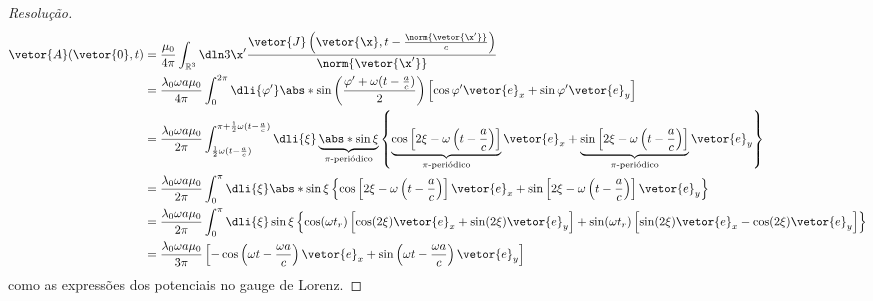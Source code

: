 \begin{proof}[Resolução]
\begin{align*}
      \vetor{A}(\vetor{0}, t) &= \frac{\mu_0}{4\pi}\int_{\mathbb{R}^3} \dln3{\x'} \frac{\vetor{J}\left(\vetor{\x}, t - \frac{\norm{\vetor{\x'}}}{c}\right)}{\norm{\vetor{\x'}}}\\
                              &= \frac{\lambda_0 \omega a \mu_0}{4\pi} \int_0^{2\pi} \dli{\varphi'}\abs*{\sin\left(\frac{\varphi' + \omega(t - \frac{a}{c})}{2}\right)} \left[\cos\varphi'\vetor{e}_x + \sin\varphi' \vetor{e}_y\right]\\
                              &= \frac{\lambda_0 \omega a \mu_0}{2\pi} \int_{\frac12 \omega(t - \frac{a}{c})}^{\pi + \frac12 \omega(t - \frac{a}{c})} \dli{\xi}\underbrace{\abs*{\sin\xi}}_{\pi\text{-periódico}} \left\{\underbrace{\cos\left[2 \xi - \omega\left(t - \frac{a}{c}\right)\right]}_{\pi\text{-periódico}}\vetor{e}_x + \underbrace{\sin\left[2 \xi - \omega\left(t - \frac{a}{c}\right)\right]}_{\pi\text{-periódico}}\vetor{e}_y\right\}\\
                              &= \frac{\lambda_0 \omega a \mu_0}{2\pi} \int_{0}^{\pi} \dli{\xi}\abs*{\sin\xi} \left\{\cos\left[2 \xi - \omega\left(t - \frac{a}{c}\right)\right]\vetor{e}_x + \sin\left[2 \xi - \omega\left(t - \frac{a}{c}\right)\right]\vetor{e}_y\right\}\\
                              &= \frac{\lambda_0 \omega a \mu_0}{2\pi}  \int_{0}^{\pi} \dli{\xi} \sin\xi \left\{\cos(\omega t_r)\left[\cos(2 \xi) \vetor{e}_x + \sin(2\xi) \vetor{e}_y \right] + \sin(\omega t_r)\left[\sin(2 \xi) \vetor{e}_x - \cos(2\xi) \vetor{e}_y \right]\right\}\\
                              &= \frac{\lambda_0 \omega a \mu_0}{3\pi} \left[- \cos\left(\omega t - \frac{\omega a}{c}\right)\vetor{e}_x + \sin\left(\omega t - \frac{\omega a}{c}\right) \vetor{e}_y\right]
   \end{align*}
   como as expressões dos potenciais no gauge de Lorenz.
\end{proof}
